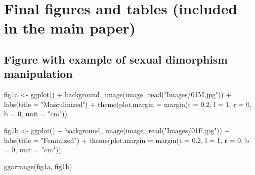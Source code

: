 \documentclass[
  bookmarksnumbered]{article}
\newenvironment{Shaded}{\begin{snugshade}}{\end{snugshade}}
\newcommand{\AttributeTok}[1]{\textcolor[rgb]{0.80,0.80,0.80}{#1}}
\newcommand{\DecValTok}[1]{\textcolor[rgb]{0.86,0.86,0.80}{#1}}
\newcommand{\FloatTok}[1]{\textcolor[rgb]{0.75,0.75,0.82}{#1}}
\newcommand{\FunctionTok}[1]{\textcolor[rgb]{0.94,0.94,0.56}{#1}}
\newcommand{\NormalTok}[1]{\textcolor[rgb]{0.80,0.80,0.80}{#1}}
\newcommand{\OtherTok}[1]{\textcolor[rgb]{0.94,0.94,0.56}{#1}}
\newcommand{\SpecialCharTok}[1]{\textcolor[rgb]{0.86,0.64,0.64}{#1}}
\newcommand{\StringTok}[1]{\textcolor[rgb]{0.80,0.58,0.58}{#1}}
\begin{document}
\section{Final figures and tables (included in the main paper)}\label{final-figures-and-tables-included-in-the-main-paper}

\closesupplement

\subsection{Figure with example of sexual dimorphism manipulation}\label{figure-with-example-of-sexual-dimorphism-manipulation}

\begin{Shaded}
\begin{Highlighting}[]
\NormalTok{fig1a }\OtherTok{\textless{}{-}} \FunctionTok{ggplot}\NormalTok{() }\SpecialCharTok{+}
  \FunctionTok{background\_image}\NormalTok{(}\FunctionTok{image\_read}\NormalTok{(}\StringTok{"Images/01M.jpg"}\NormalTok{)) }\SpecialCharTok{+}
  \FunctionTok{labs}\NormalTok{(}\AttributeTok{title =} \StringTok{"Masculinized"}\NormalTok{) }\SpecialCharTok{+}
  \FunctionTok{theme}\NormalTok{(}\AttributeTok{plot.margin =} \FunctionTok{margin}\NormalTok{(}\AttributeTok{t =} \FloatTok{0.2}\NormalTok{, }\AttributeTok{l =} \DecValTok{1}\NormalTok{, }\AttributeTok{r =} \DecValTok{0}\NormalTok{, }\AttributeTok{b =} \DecValTok{0}\NormalTok{, }\AttributeTok{unit =} \StringTok{"cm"}\NormalTok{))}

\NormalTok{fig1b }\OtherTok{\textless{}{-}} \FunctionTok{ggplot}\NormalTok{() }\SpecialCharTok{+}
  \FunctionTok{background\_image}\NormalTok{(}\FunctionTok{image\_read}\NormalTok{(}\StringTok{"Images/01F.jpg"}\NormalTok{)) }\SpecialCharTok{+}
  \FunctionTok{labs}\NormalTok{(}\AttributeTok{title =} \StringTok{"Feminized"}\NormalTok{) }\SpecialCharTok{+}
  \FunctionTok{theme}\NormalTok{(}\AttributeTok{plot.margin =} \FunctionTok{margin}\NormalTok{(}\AttributeTok{t =} \FloatTok{0.2}\NormalTok{, }\AttributeTok{l =} \DecValTok{1}\NormalTok{, }\AttributeTok{r =} \DecValTok{0}\NormalTok{, }\AttributeTok{b =} \DecValTok{0}\NormalTok{, }\AttributeTok{unit =} \StringTok{"cm"}\NormalTok{))}

\FunctionTok{ggarrange}\NormalTok{(fig1a, fig1b)}
\end{Highlighting}
\end{Shaded}
\end{document}
